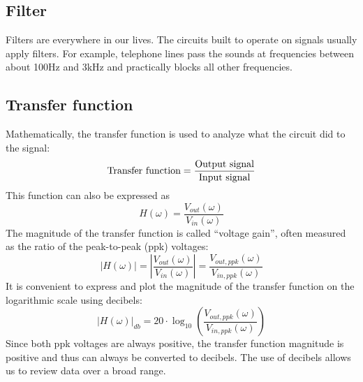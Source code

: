 \documentclass[a4paper]{report}
\begin{document}
\subsection{Filter}
Filters are everywhere in our lives. The circuits built to operate on signals usually apply filters. For example, telephone lines pass the sounds at frequencies between about 100Hz and 3kHz and practically blocks all other frequencies.
\subsection{Transfer function}
Mathematically, the transfer function is used to analyze what the circuit did to the signal:
$$\rm Transfer\ function=\frac{Output\ signal}{Input\ signal}$$
This function can also be expressed as
$$H(\omega)=\frac{V_{out}(\omega)}{V_{in}(\omega)}$$
The magnitude of the transfer function is called “voltage gain”, often measured as the ratio of the peak-to-peak (ppk) voltages:
$$|H(\omega)|=\left|\frac{V_{out}(\omega)}{V_{in}(\omega)}\right|=\frac{V_{out, ppk}(\omega)}{V_{in, ppk}(\omega)}$$
It is convenient to express and plot the magnitude of the transfer function on the logarithmic scale using decibels:
$$|H(\omega)|_{db}=20\cdot\log_10\left(\frac{V_{out, ppk}(\omega)}{V_{in, ppk}(\omega)}\right)$$
Since both ppk voltages are always positive, the transfer function magnitude is positive and thus can always be converted to decibels. The use of decibels allows us to review data over a broad range.
\end{document}
